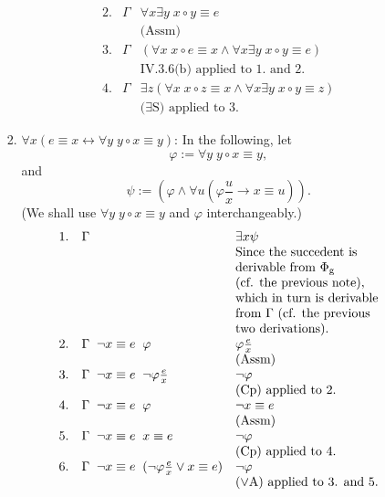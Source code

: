 \begin{enumerate}[1.]
\begin{enumerate}[(i)]
\begin{enumerate}
\[\begin{array}{lll}
2. & \Gamma & \forall x \exists y \; x \circ y \equiv e \\
\  & \      & \mbox{(Assm)} \\
3. & \Gamma & (\forall x \; x \circ e \equiv x \land \forall x \exists y \; x \circ y \equiv e) \\
\  & \      & \mbox{IV.3.6(b) applied to 1. and 2.} \\
4. & \Gamma & \exists z (\forall x \; x \circ z \equiv x \land \forall x \exists y \; x \circ y \equiv z) \\
\  & \      & \mbox{($\exists$S) applied to 3.}
\end{array}
\]
\item $\forall x (e \equiv x \leftrightarrow \forall y \; y \circ x \equiv y)$: In the following, let
\[
\varphi := \forall y \; y \circ x \equiv y,
\]
and
\[
\psi := (\varphi \land \forall u (\varphi\frac{u}{x} \rightarrow x \equiv u)).
\]
(We shall use $\forall y \; y \circ x \equiv y$ and $\varphi$ interchangeably.)
\[
\begin{array}{lll}
1. & \Gamma & \exists x \psi \\
\  & \      & \mbox{Since the succedent is} \\
\  & \      & \mbox{derivable from $\Phi_{\mbox{\scriptsize g}}$} \\
\  & \      & \mbox{(cf. the previous note),} \\
\  & \      & \mbox{which in turn is derivable} \\
\  & \      & \mbox{from $\Gamma$ (cf. the previous} \\
\  & \      & \mbox{two derivations).} \\
2. & \Gamma \;\; \neg x \equiv e \;\; \varphi & \varphi\frac{e}{x} \\
\  & \      & \mbox{(Assm)} \\
3. & \Gamma \;\; \neg x \equiv e \;\; \neg \varphi\frac{e}{x} & \neg \varphi \\
\  & \      & \mbox{(Cp) applied to 2.} \\
4. & \Gamma \;\; \neg x \equiv e \;\; \varphi & \neg x \equiv e \\
\  & \      & \mbox{(Assm)} \\
5. & \Gamma \;\; \neg x \equiv e \;\; x \equiv e & \neg \varphi \\
\  & \      & \mbox{(Cp) applied to 4.} \\
6. & \Gamma \;\; \neg x \equiv e \;\; (\neg \varphi\frac{e}{x} \lor x \equiv e) & \neg \varphi \\
\  & \      & \mbox{($\lor$A) applied to 3. and 5.} \\

\end{array}\]
\end{enumerate}
\end{enumerate}
\end{enumerate}
